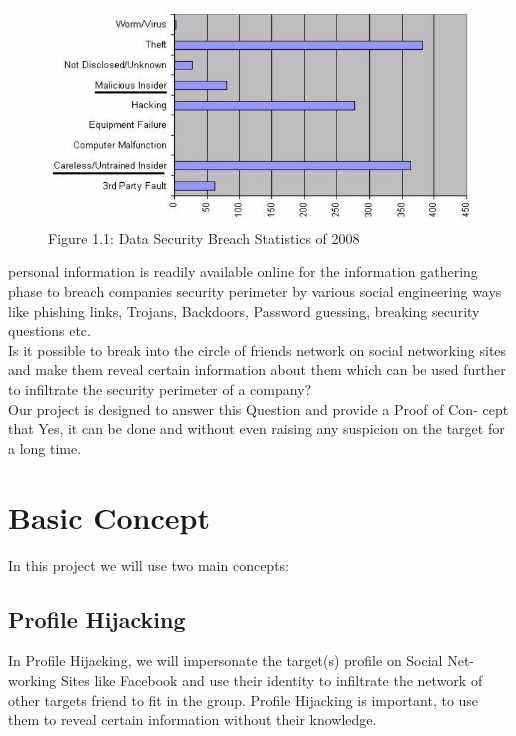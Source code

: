 \begin{figure}[htb]
\centering
\includegraphics[scale=0.6]{project/diagrams/figdata}
\caption{Figure 1.1: Data Security Breach Statistics of 2008}
\label{fig:data} %
\end{figure}

personal information is readily available online for the information gathering
phase to breach companies security perimeter by various social engineering
ways like phishing links, Trojans, Backdoors, Password guessing, breaking
security questions etc.\\[0.5cm]
Is it possible to break into the circle of friends network on social networking
sites and make them reveal certain information about them which can be
used further to infiltrate the security perimeter of a company?\\[0.5cm]
Our project is designed to answer this Question and provide a Proof of Con-
cept that Yes, it can be done and without even raising any suspicion on the
target for a long time.



\section{Basic Concept}
In this project we will use two main concepts:

\subsection{Profile Hijacking}

In Profile Hijacking, we will impersonate the target(s) profile on Social Net-
working Sites like Facebook and use their identity to infiltrate the network
of other targets friend to fit in the group. Profile Hijacking is important, to
use them to reveal certain information without their knowledge.\cite{paper_allyourcontacts}


